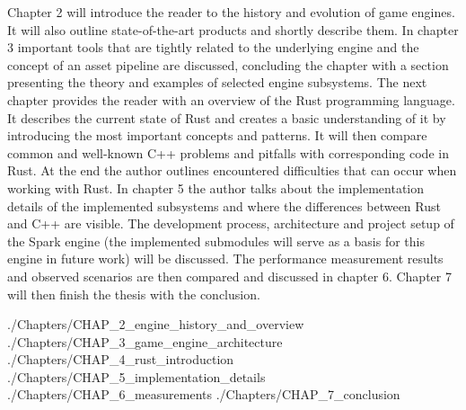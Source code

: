 \documentclass[MGS, Master, english]{twbook}
\providecommand\listacroname{}
\renewcommand\listacroname{List of Abbreviations}
\renewcommand\listacroname{Abkürzungsverzeichnis}
\newcommand{\listofcode}{\phantomsection\lstlistoflistings}
\begin{document}
Chapter 2 will introduce the reader to the history and evolution of game engines. It will also outline state-of-the-art products and shortly describe them. In chapter 3 important tools that are tightly related to the underlying engine and the concept of an asset pipeline are discussed, concluding the chapter with a section presenting the theory and examples of selected engine subsystems.
The next chapter provides the reader with an overview of the Rust programming language. It describes the current state of Rust and creates a basic understanding of it by introducing the most important concepts and patterns. It will then compare common and well-known C++ problems and pitfalls with corresponding code in Rust. At the end the author outlines encountered difficulties that can occur when working with Rust. 
In chapter 5 the author talks about the implementation details of the implemented subsystems and where the differences between Rust and C++ are visible. The development process, architecture and project setup of the Spark engine (the implemented submodules will serve as a basis for this engine in future work) will be discussed. The performance measurement results and observed scenarios are then compared and discussed in chapter 6. Chapter 7 will then finish the thesis with the conclusion.

 {./Chapters/CHAP_2_engine_history_and_overview}
 {./Chapters/CHAP_3_game_engine_architecture}
 {./Chapters/CHAP_4_rust_introduction}
 {./Chapters/CHAP_5_implementation_details}
 {./Chapters/CHAP_6_measurements}
 {./Chapters/CHAP_7_conclusion}

%
%
\clearpage
\nocite{GEA_2}
\nocite{C_Lan}
\nocite{ProRus}
\nocite{GEG_3}
\nocite{Portisch17}


\clearpage
\listoffigures
\clearpage

\listoftables
\clearpage

\listofcode
\clearpage

\addcontentsline{toc}{chapter}{\listacroname}
\end{document}
